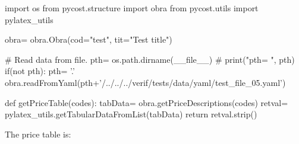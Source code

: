 \documentclass[11pt]{article}%
\begin{document}
 
 
 
\begin{pycode} 
 
import os
from pycost.structure import obra
from pycost.utils import pylatex_utils

obra= obra.Obra(cod="test", tit="Test title")

# Read data from file.
pth= os.path.dirname(__file__)
# print("pth= ", pth)
if(not pth):
    pth= '.'
obra.readFromYaml(pth+'/../../../verif/tests/data/yaml/test_file_05.yaml')

def getPriceTable(codes):
    tabData= obra.getPriceDescriptions(codes)
    retval= pylatex_utils.getTabularDataFromList(tabData)
    return retval.strip()
        
\end{pycode}
 
The price table is:

\begin{center}
\begin{small}
  \end{small}
\end{center}

\lipsum
\end{document}
